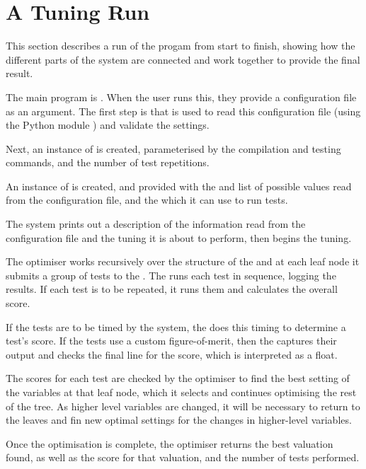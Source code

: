 \documentclass[a4paper, draft]{article}
\begin{document}
\clearpage

\section{A Tuning Run}
This section describes a run of the progam from start to finish, showing how 
the different parts of the system are connected and work together to provide 
the final result.

The main program is . When the user runs this, they provide 
a configuration file as an argument. The first step is that 
 is used to read this configuration file (using the 
Python module ) and validate the settings.

Next, an instance of  is created, parameterised by the 
compilation and testing commands, and the number of test repetitions.

An instance of  is created, and provided with the 
 and list of possible values read from the configuration file, 
and the  which it can use to run tests. 

The system prints out a description of the information read from the 
configuration file and the tuning it is about to perform, 
then begins the tuning.

The optimiser works recursively over the structure of the  and 
at each leaf node it submits a group of tests to the . The 
 runs each test in sequence, logging the results. If each 
test is to be repeated, it runs them and calculates the overall score.

If the tests are to be timed by the system, the  does this 
timing to determine a test's score. If the tests use a custom figure-of-merit, 
then the  captures their output and checks the final line 
for the score, which is interpreted as a float.

The scores for each test are checked by the optimiser to find the best setting 
of the variables at that leaf node, which it selects and continues optimising 
the rest of the tree. As higher level variables are changed, it will be 
necessary to return to the leaves and fin new optimal settings for the changes 
in higher-level variables.

Once the optimisation is complete, the optimiser returns the best valuation 
found, as well as the score for that valuation, and the number of tests 
performed.
\end{document}
